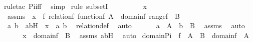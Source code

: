 \begin{isabellebody}
{\isacharparenleft}{\kern0pt}rule{\isacharunderscore}{\kern0pt}tac\ Pi{\isacharunderscore}{\kern0pt}iff{\isacharparenright}{\kern0pt}\ \isamarkupfalse%
\ simp\ \isamarkupfalse%
{\isacharparenleft}{\kern0pt}rule\ subsetI{\isacharparenright}{\kern0pt}\ \ \ \isanewline
{}\isamarkupfalse%
\ {\isacharminus}{\kern0pt}\ \isanewline
\ \ \isamarkupfalse%
\ x\ \isamarkupfalse%
\ assms\ {\isacharcolon}{\kern0pt}\ {\isachardoublequoteopen}x\ {\isasymin}\ f{\isachardoublequoteclose}\ {\isachardoublequoteopen}relation{\isacharparenleft}{\kern0pt}f{\isacharparenright}{\kern0pt}{\isachardoublequoteclose}\ {\isachardoublequoteopen}function{\isacharparenleft}{\kern0pt}f{\isacharparenright}{\kern0pt}{\isachardoublequoteclose}\ {\isachardoublequoteopen}A\ {\isacharequal}{\kern0pt}\ domain{\isacharparenleft}{\kern0pt}f{\isacharparenright}{\kern0pt}{\isachardoublequoteclose}\ {\isachardoublequoteopen}range{\isacharparenleft}{\kern0pt}f{\isacharparenright}{\kern0pt}\ {\isasymsubseteq}\ B{\isachardoublequoteclose}\isanewline
\ \ \isamarkupfalse%
\ \isamarkupfalse%
\ a\ b\ \ abH\ {\isacharcolon}{\kern0pt}\ {\isachardoublequoteopen}x\ {\isacharequal}{\kern0pt}\ {\isacharless}{\kern0pt}a{\isacharcomma}{\kern0pt}\ b{\isachargreater}{\kern0pt}{\isachardoublequoteclose}\ \isamarkupfalse%
\ relation{\isacharunderscore}{\kern0pt}def\ \isamarkupfalse%
\ auto\ \isanewline
\ \ \isamarkupfalse%
\ \isamarkupfalse%
\ {\isachardoublequoteopen}a\ {\isasymin}\ A\ {\isasymand}\ b\ {\isasymin}\ B{\isachardoublequoteclose}\ \isamarkupfalse%
\ assms\ \isamarkupfalse%
\ auto\ \isamarkupfalse%
\ \isanewline
\ \ \isamarkupfalse%
\ \isamarkupfalse%
\ {\isachardoublequoteopen}x\ {\isasymin}\ domain{\isacharparenleft}{\kern0pt}f{\isacharparenright}{\kern0pt}\ {\isasymtimes}\ B{\isachardoublequoteclose}\ \isamarkupfalse%
\ assms\ abH\ \isamarkupfalse%
\ auto\isanewline
{}\isamarkupfalse%
%
\endisatagproof
{\isafoldproof}%
%
\isadelimproof
\isanewline
%
\endisadelimproof
\isanewline
{}\isamarkupfalse%
\ domain{\isacharunderscore}{\kern0pt}Pi\ {\isacharcolon}{\kern0pt}\ {\isachardoublequoteopen}f\ {\isasymin}\ A\ {\isasymrightarrow}\ B\ {\isasymLongrightarrow}\ domain{\isacharparenleft}{\kern0pt}f{\isacharparenright}{\kern0pt}\ {\isacharequal}{\kern0pt}\ A{\isachardoublequoteclose}\ \isanewline

\end{isabellebody}
